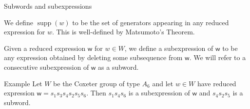 \documentclass[9pt]{beamer}
\newcommand{\supp}{\operatorname{supp}}
\newcommand{\w}{{\textsf{w}}}
\begin{document}
\begin{frame}{Subwords and subexpressions}
\begin{definition} We define $\supp(w)$ to be the set of generators appearing in any reduced expression for $w$. This is well-defined by Matsumoto's Theorem.
\end{definition}

\begin{definition} Given a reduced expression $\w$ for $w \in W$, we define a \alert{subexpression} of $\w$ to be any expression obtained by deleting some subsequence from $\w$. We will refer to a consecutive subexpression of $\w$ as a \alert{subword}.
\end{definition}
    \pause
\begin{block}{Example} Let $W$ be the Coxeter group of type $A_6$ and let $w \in W$ have reduced expression $\w = s_1s_3s_4s_2s_5s_6$.
    Then $s_1s_4s_6$ is a subexpression of $\w$ and $s_4s_2s_5$ is a subword.
\end{block}
\end{frame}


\end{document}
